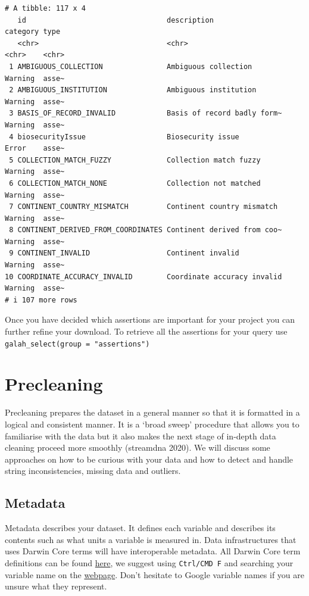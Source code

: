 \documentclass[
  letterpaper,
  DIV=11,
  numbers=noendperiod,
  oneside]{scrreprt}
\begin{document}
\begin{verbatim}
# A tibble: 117 x 4
   id                                 description                 category type 
   <chr>                              <chr>                       <chr>    <chr>
 1 AMBIGUOUS_COLLECTION               Ambiguous collection        Warning  asse~
 2 AMBIGUOUS_INSTITUTION              Ambiguous institution       Warning  asse~
 3 BASIS_OF_RECORD_INVALID            Basis of record badly form~ Warning  asse~
 4 biosecurityIssue                   Biosecurity issue           Error    asse~
 5 COLLECTION_MATCH_FUZZY             Collection match fuzzy      Warning  asse~
 6 COLLECTION_MATCH_NONE              Collection not matched      Warning  asse~
 7 CONTINENT_COUNTRY_MISMATCH         Continent country mismatch  Warning  asse~
 8 CONTINENT_DERIVED_FROM_COORDINATES Continent derived from coo~ Warning  asse~
 9 CONTINENT_INVALID                  Continent invalid           Warning  asse~
10 COORDINATE_ACCURACY_INVALID        Coordinate accuracy invalid Warning  asse~
# i 107 more rows
\end{verbatim}

Once you have decided which assertions are important for your project
you can further refine your download. To retrieve all the assertions for
your query use \texttt{galah\_select(group\ =\ "assertions")}


\hypertarget{precleaning}{%
\chapter{Precleaning}\label{precleaning}}

Precleaning prepares the dataset in a general manner so that it is
formatted in a logical and consistent manner. It is a `broad sweep'
procedure that allows you to familiarise with the data but it also makes
the next stage of in-depth data cleaning proceed more smoothly
(streamdna 2020). We will discuss some approaches on how to be curious
with your data and how to detect and handle string inconsistencies,
missing data and outliers.

\hypertarget{metadata}{%
\section{Metadata}\label{metadata}}

Metadata describes your dataset. It defines each variable and describes
its contents such as what units a variable is measured in. Data
infrastructures that uses Darwin Core terms will have interoperable
metadata. All Darwin Core term definitions can be found
\href{https://dwc.tdwg.org/terms/}{here}, we suggest using
\texttt{Ctrl/CMD\ F} and searching your variable name on the
\href{https://dwc.tdwg.org/terms/}{webpage}. Don't hesitate to Google
variable names if you are unsure what they represent.
\end{document}
